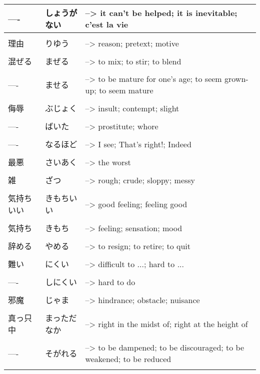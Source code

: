 \documentclass{article}
\begin{document}
\begin{tabular}{ l | l p{14cm} }
---- &しょうがない &--> it can't be helped; it is inevitable; c'est la vie   \\ \hline\\[-1em]
理由 &りゆう &--> reason; pretext; motive   \\ \hline\\[-1em]
混ぜる &まぜる &--> to mix; to stir; to blend   \\ \hline\\[-1em]
---- &ませる &--> to be mature for one's age; to seem grown-up; to seem mature   \\ \hline\\[-1em]
侮辱 &ぶじょく &--> insult; contempt; slight   \\ \hline\\[-1em]
---- &ばいた &--> prostitute; whore   \\ \hline\\[-1em]
---- &なるほど &--> I see; That's right!; Indeed   \\ \hline\\[-1em]
最悪 &さいあく &--> the worst   \\ \hline\\[-1em]
雑 &ざつ &--> rough; crude; sloppy; messy   \\ \hline\\[-1em]
気持ちいい &きもちいい &--> good feeling; feeling good \\ \hline\\[-1em]
気持ち &きもち &--> feeling; sensation; mood \\ \hline\\[-1em]
辞める &やめる &--> to resign; to retire; to quit \\ \hline\\[-1em]
難い &にくい &--> difficult to ...; hard to ... \\ \hline\\[-1em]
---- &しにくい &--> hard to do \\ \hline\\[-1em]
邪魔 &じゃま &--> hindrance; obstacle; nuisance \\ \hline\\[-1em]
真っ只中 &まっただなか &--> right in the midst of; right at the height of \\ \hline\\[-1em]
---- &そがれる &--> to be dampened; to be discouraged; to be weakened; to be reduced   \\ \hline\\[-1em]
\end{tabular} \\
\end{document}
